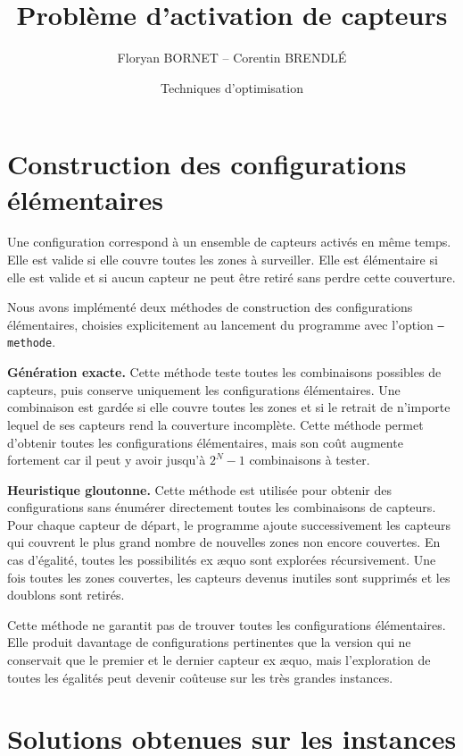 \documentclass[10pt,a4paper]{article}
\title{\vspace{-0.8cm}\textbf{Problème d'activation de capteurs}}
\author{Floryan BORNET -- Corentin BRENDLÉ}
\date{Techniques d'optimisation}
\begin{document}
\maketitle
\vspace{-0.5cm}

\section{Construction des configurations élémentaires}

Une configuration correspond à un ensemble de capteurs activés en même temps. Elle est valide si elle couvre toutes les zones à surveiller. Elle est élémentaire si elle est valide et si aucun capteur ne peut être retiré sans perdre cette couverture.

Nous avons implémenté deux méthodes de construction des configurations élémentaires, choisies explicitement au lancement du programme avec l'option \texttt{--methode}.

\textbf{Génération exacte.}
Cette méthode teste toutes les combinaisons possibles de capteurs, puis conserve uniquement les configurations élémentaires. Une combinaison est gardée si elle couvre toutes les zones et si le retrait de n'importe lequel de ses capteurs rend la couverture incomplète. Cette méthode permet d'obtenir toutes les configurations élémentaires, mais son coût augmente fortement car il peut y avoir jusqu'à $2^N-1$ combinaisons à tester.

\textbf{Heuristique gloutonne.}
Cette méthode est utilisée pour obtenir des configurations sans énumérer directement toutes les combinaisons de capteurs. Pour chaque capteur de départ, le programme ajoute successivement les capteurs qui couvrent le plus grand nombre de nouvelles zones non encore couvertes. En cas d'égalité, toutes les possibilités ex æquo sont explorées récursivement. Une fois toutes les zones couvertes, les capteurs devenus inutiles sont supprimés et les doublons sont retirés.

Cette méthode ne garantit pas de trouver toutes les configurations élémentaires. Elle produit davantage de configurations pertinentes que la version qui ne conservait que le premier et le dernier capteur ex æquo, mais l'exploration de toutes les égalités peut devenir coûteuse sur les très grandes instances.

\section{Solutions obtenues sur les instances}
\end{document}
